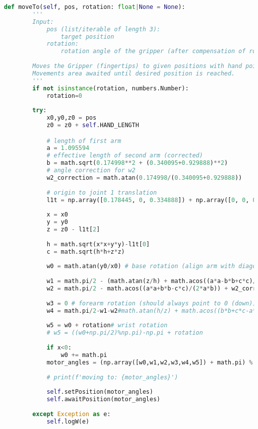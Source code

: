 \begin{lstlisting}[language=python]
def moveTo(self, pos, rotation: float|None = None):
        '''
        Input:
            pos (list/iterable of length 3):
                target position
            rotation:
                rotation angle of the gripper (after compensation of robots rotation)
        
        Moves the Gripper (fingertips) to given positions with hand pointing down.
        Movements area awaited until desired position is reached.
        '''
        if not isinstance(rotation, numbers.Number):
            rotation=0
        
        try:
            x0,y0,z0 = pos
            z0 = z0 + self.HAND_LENGTH

            # length of first arm
            a = 1.095594
            # effective length of second arm (corrected)
            b = math.sqrt(0.174998**2 + (0.340095+0.929888)**2) 
            # angle correction for w2
            w2_correction = math.atan(0.174998/(0.340095+0.929888))
            
            # origin to joint 1 translation
            l1t = np.array([0.178445, 0, 0.334888]) + np.array([0, 0, 0.159498])
                
            x = x0
            y = y0
            z = z0 - l1t[2]
            
            h = math.sqrt(x*x+y*y)-l1t[0]
            c = math.sqrt(h*h+z*z)
            
            w0 = math.atan(y0/x0) # base rotation (align arm with diagonal h on the xy plane)
        
            w1 = math.pi/2 - (math.atan(z/h) + math.acos((a*a-b*b+c*c)/(2*a*c))) # shoulder / first link pitch
            w2 = math.pi/2 - math.acos((a*a+b*b-c*c)/(2*a*b)) + w2_correction# elbow direction
            
            w3 = 0 # forearm rotation (should always point to 0 (down))
            w4 = math.pi/2-w1-w2#math.atan(h/z) + math.acos((b*b+c*c-a*a)/(2*b*c)) - math.pi/2# wrist direction
            
            w5 = w0 + rotation# wrist rotation
            # w5 = ((w0+np.pi/2)%np.pi)-np.pi + rotation
            
            if x<0:
                w0 += math.pi
            motor_angles = (np.array([w0,w1,w2,w3,w4,w5]) + math.pi) % (2*math.pi) - math.pi
            
            # print(f'moving to: {motor_angles}')
            
            self.setPosition(motor_angles)
            self.awaitPosition(motor_angles)
                
        except Exception as e:
            self.logW(e)
\end{lstlisting}



